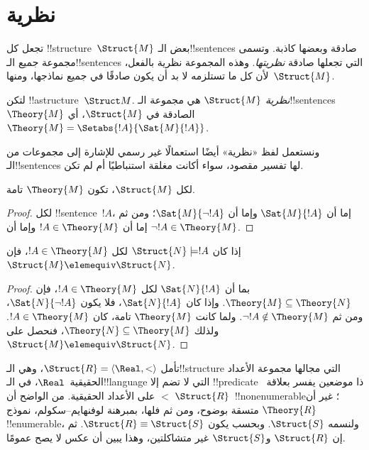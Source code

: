 \documentclass[../../../include/open-logic-section]{subfiles}
\begin{document}

\section{نظرية }

تجعل كل !!{structure}~$\Struct{M}$ بعض الـ!!{sentence}s صادقة وبعضها
كاذبة. وتسمى مجموعة جميع الـ!!{sentence}s التي تجعلها صادقة
\emph{نظريتها}. وهذه المجموعة نظرية بالفعل، لأن كل ما تستلزمه لا بد أن
يكون صادقًا في جميع نماذجها، ومنها~$\Struct{M}$.

\begin{defn}
  لتكن !!a{structure}~$\Struct M$. \emph{نظرية} $\Struct{M}$ هي مجموعة
  الـ!!{sentence}s~$\Theory{M}$ الصادقة في $\Struct{M}$، أي
  $\Theory{M} = \Setabs{!A}{\Sat{M}{!A}}$.
\end{defn}

ونستعمل لفظ «نظرية» أيضًا استعمالًا غير رسمي للإشارة إلى مجموعات من
الـ!!{sentence}s لها تفسير مقصود، سواء أكانت مغلقة استنباطيًا أم لم تكن.

\begin{prop}
لكل $\Struct{M}$، تكون $\Theory{M}$ تامة.
\end{prop}

\begin{proof}
لكل !!{sentence}~$!A$، إما أن $\Sat{M}{!A}$ وإما أن
$\Sat{M}{\lnot !A}$؛ ومن ثم إما أن $!A \in \Theory{M}$ وإما أن
$\lnot !A \in \Theory{M}$.
\end{proof}

\begin{prop}
  إذا كان $\Struct{N} \models !A$ لكل $!A \in \Theory{M}$، فإن
  $\Struct{M} \elemequiv \Struct{N}$.
\end{prop}

\begin{proof}
بما أن $\Sat{N}{!A}$ لكل $!A \in \Theory{M}$، فإن
$\Theory{M} \subseteq \Theory{N}$. وإذا كان $\Sat{N}{!A}$، فلا يكون
$\Sat{N}{\lnot !A}$، ومن ثم $\lnot !A \notin \Theory{M}$. ولما كانت
$\Theory{M}$ تامة، كان $!A \in \Theory{M}$. ولذلك
$\Theory{N} \subseteq \Theory{M}$، فنحصل على
$\Struct{M} \elemequiv \Struct{N}$.
\end{proof}

\begin{rem}
  تأمل $\Struct{R} = \langle\Real, <\rangle$، وهي الـ!!{structure} التي
  مجالها مجموعة الأعداد الحقيقية~$\Real$، في الـ!!{language} التي لا
  تضم إلا !!{predicate} ذا موضعين يفسر بعلاقة~$<$ على الأعداد الحقيقية.
  من الواضح أن $\Struct{R}$~!!{nonenumerable}؛ غير أن $\Theory{R}$
  متسقة بوضوح، ومن ثم فلها، بمبرهنة لوفنهايم--سكولم، نموذج
  !!{enumerable}، ولنسمه $\Struct{S}$. وبحسب  يكون
  $\Struct{R} \equiv \Struct{S}$. ثم إن $\Struct{R}$ و$\Struct{S}$
  غير متشاكلتين، وهذا يبين أن عكس  لا يصح عمومًا.
\end{rem}
\end{document}
